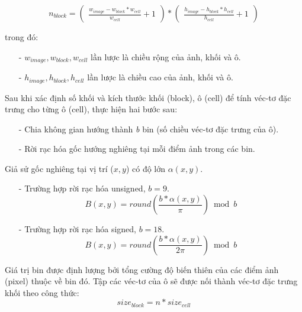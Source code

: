\begin{equation}
	n_{block} = \left (\begin{array}{cc} \frac{w_{image} - w_{block} * w_{cell}}{w_{cell}} + 1 \end{array}\right) *\left (\begin{array}{cc} \frac{h_{image} - h_{block} * h_{cell}}{h_{cell}} + 1\end{array}\right)
\end{equation}

trong đó:

\begin{itemize}
	\item[-] $w_{image}, w_{block}, w_{cell}$ lần lược là chiều rộng của ảnh, khối và ô.
	\item[-] $h_{image}, h_{block}, h_{cell}$ lần lược là chiều cao của ảnh, khối và ô.
\end{itemize}

Sau khi xác định số khối và kích thước khối (block), ô (cell) để tính véc-tơ đặc trưng cho từng ô (cell), thực hiện hai bước sau:
\begin{itemize}
	\item[-] Chia không gian hướng thành \emph{b} bin (số chiều véc-tơ đặc trưng của ô).
	\item[-] Rời rạc hóa gốc hướng nghiêng tại mỗi điểm ảnh trong các bin.
\end{itemize}

Giả sử gốc nghiêng tại vị trí ($x, y$) có độ lớn $\alpha(x,y)$.
\begin{itemize}
	\item[-] Trường hợp rời rạc hóa unsigned, $b = 9$.
	\begin{equation}
		B(x,y) = round(\frac{b*\alpha(x,y)}{\pi}) \bmod b 
	\end{equation}
	
	\item[-] Trường hợp rời rạc hóa signed, $b = 18$.
	\begin{equation}
		B(x,y) = round(\frac{b*\alpha(x,y)}{2\pi}) \bmod b
	\end{equation}
\end{itemize}

Giá trị bin được định lượng bởi tổng cường  độ biến thiên của các điểm ảnh (pixel) thuộc về bin đó. Tập các véc-tơ của ô sẽ được nối thành véc-tơ đặc trưng khối theo công thức:
\begin{equation}
	size_{block} = n * size_{cell}
\end{equation}

